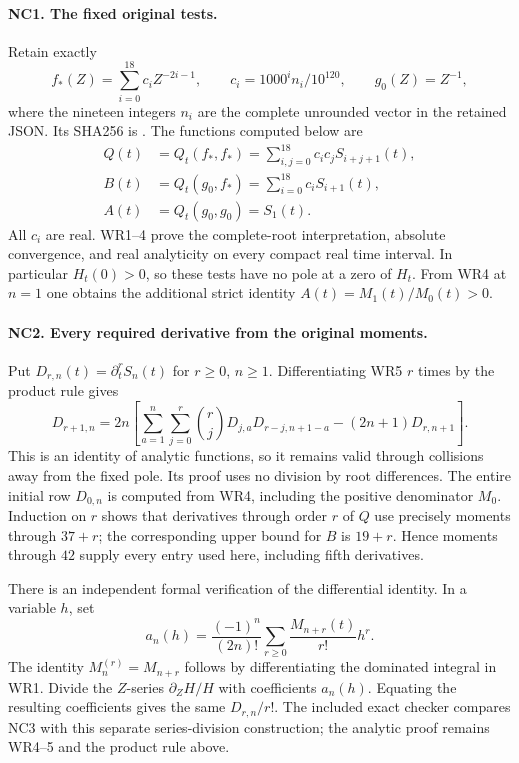 \paragraph{NC1. The fixed original tests.}
Retain exactly
\[
 f_*(Z)=\sum_{i=0}^{18}c_i Z^{-2i-1},\qquad
 c_i=1000^i n_i/10^{120},\qquad g_0(Z)=Z^{-1},
 \tag{NC1}
\]
where the nineteen integers $n_i$ are the complete unrounded vector
in the retained JSON. Its SHA256 is
.
The functions computed below are
\[
 \begin{split}
 Q(t)&=Q_t(f_*,f_*)=\sum_{i,j=0}^{18}c_ic_j S_{i+j+1}(t),\\
 B(t)&=Q_t(g_0,f_*)=\sum_{i=0}^{18}c_i S_{i+1}(t),\\
 A(t)&=Q_t(g_0,g_0)=S_1(t).
 \end{split}\tag{NC2}
\]
All $c_i$ are real. WR1--4 prove the complete-root interpretation,
absolute convergence, and real analyticity on every compact real
time interval. In particular $H_t(0)>0$, so these tests have no pole
at a zero of $H_t$. From WR4 at $n=1$ one obtains the additional
strict identity $A(t)=M_1(t)/M_0(t)>0$.

\paragraph{NC2. Every required derivative from the original moments.}
Put $D_{r,n}(t)=\partial_t^r S_n(t)$ for $r\ge0$, $n\ge1$.
Differentiating WR5 $r$ times by the product rule gives
\[
 D_{r+1,n}=2n\left[
 \sum_{a=1}^n\sum_{j=0}^r\binom rj
 D_{j,a}D_{r-j,n+1-a}-(2n+1)D_{r,n+1}\right].
 \tag{NC3}
\]
This is an identity of analytic functions, so it remains valid
through collisions away from the fixed pole. Its proof uses no
division by root differences. The entire initial row $D_{0,n}$
is computed from WR4, including the positive denominator $M_0$.
Induction on $r$ shows that derivatives through order $r$ of $Q$
use precisely moments through $37+r$; the corresponding upper
bound for $B$ is $19+r$. Hence moments through $42$ supply every
entry used here, including fifth derivatives.

There is an independent formal verification of the differential
identity. In a variable $h$, set
\[
 a_n(h)=\frac{(-1)^n}{(2n)!}
       \sum_{r\ge0}\frac{M_{n+r}(t)}{r!}h^r.
 \tag{NC4}
\]
The identity $M_n^{(r)}=M_{n+r}$ follows by differentiating the
dominated integral in WR1. Divide the $Z$-series $\partial_ZH/H$
with coefficients $a_n(h)$. Equating the resulting coefficients
gives the same $D_{r,n}/r!$. The included exact checker compares
NC3 with this separate series-division construction; the analytic
proof remains WR4--5 and the product rule above.

